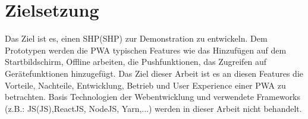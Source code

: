 \newpage
\section{Zielsetzung}\label{sub:Zielsetzung}
Das Ziel  ist es, einen \acl{SHP}(\acs{SHP}) zur Demonstration zu entwickeln. 
Dem Prototypen werden die \acs{PWA} typischen Features wie das Hinzufügen auf dem Startbildschirm, Offline arbeiten, die Pushfunktionen, 
das Zugreifen auf Gerätefunktionen hinzugefügt. 
Das Ziel dieser Arbeit ist es an diesen Features die Vorteile, Nachteile, Entwicklung, Betrieb und User Experience einer \acl{PWA} zu betrachten.
Basis Technologien der Webentwicklung und verwendete Frameworks (z.B.: \acl{JS}(\acs{JS}),ReactJS, NodeJS, Yarn,...) werden in dieser Arbeit nicht behandelt.
